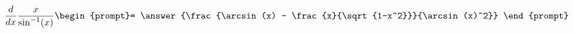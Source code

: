 \documentclass{ximera}
\author{Steven Gubkin}
\begin{document}
\begin{exercise}

\[
\frac{d}{dx} \frac{x}{\sin^{-1}(x)} \begin{prompt}= \answer{\frac{\arcsin(x) - \frac{x}{\sqrt{1-x^2}}}{\arcsin(x)^2}}
\end{prompt}
\]


\end{exercise}
\end{document}
